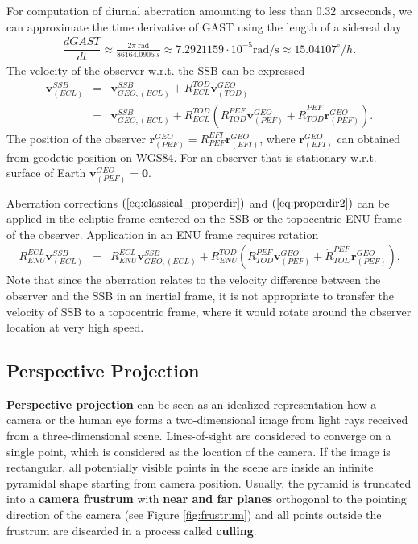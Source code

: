 \documentclass [12pt, a4paper] {article}
\newcommand{\vc}[1]
{
	\boldsymbol{#1}
}
\newcommand{\diff}[2]
{
	\dfrac{d #1}{d #2}
}
\begin{document}
For computation of diurnal aberration amounting to less than $0.32$ arcseconds, 
we can approximate the time derivative of GAST using the length of a sidereal 
day
\begin {eqnarray}
    \diff{GAST}{t}
    \approx 
    \frac{2\pi\:\textrm{rad}}{86164.0905\:s}
    \approx 7.2921159\cdot 10^{-5} \textrm{rad/s}
    \approx 15.04107^\circ /h.
\end {eqnarray}
The velocity of the observer w.r.t. the SSB can be expressed 
\begin {eqnarray}
    \vc v_{(ECL)}^{SSB} 
    &=& 
    \vc v_{GEO,(ECL)}^{SSB} + R_{ECL}^{TOD}\vc v_{(TOD)}^{GEO} 
    \\
    &=& 
    \vc v_{GEO,(ECL)}^{SSB} + R_{ECL}^{TOD}
    \left(
    R_{TOD}^{PEF}\vc v_{(PEF)}^{GEO}
    +
    {{\dot R}_{TOD}^{PEF}}\vc r_{(PEF)}^{GEO}
    \right).
\end {eqnarray}
The position of the observer 
$\vc r_{(PEF)}^{GEO} = R_{PEF}^{EFI}\vc r_{(EFI)}^{GEO}$, where 
$\vc r_{(EFI)}^{GEO}$ can obtained from geodetic position on WGS84.
For an observer that is stationary w.r.t. surface of Earth 
$\vc v_{(PEF)}^{GEO} = \vc 0$.

Aberration corrections $(\ref{eq:classical_properdir})$ and 
$(\ref{eq:properdir2})$ can be applied in the ecliptic frame centered 
on the SSB or the topocentric ENU frame of the observer. Application in an 
ENU frame requires rotation 
\begin {eqnarray}
    R^{ECL}_{ENU}\vc v_{(ECL)}^{SSB} 
    &=& 
    R^{ECL}_{ENU}\vc v_{GEO,(ECL)}^{SSB} + R_{ENU}^{TOD}
    \left(
    R_{TOD}^{PEF}\vc v_{(PEF)}^{GEO}
    +
    {{\dot R}_{TOD}^{PEF}}\vc r_{(PEF)}^{GEO}
    \right).
\end {eqnarray}
Note that since the aberration relates to the velocity difference between 
the observer and the SSB in an inertial frame, it is not appropriate to 
transfer the velocity of SSB to a topocentric frame, where it would rotate 
around the observer location at very high speed.
\subsection{Perspective Projection}
\textbf{Perspective projection} can be seen as an idealized representation how a
camera or the human eye forms a two-dimensional image from light rays received from 
a three-dimensional scene. Lines-of-sight are considered to converge on a single point,
which is considered as the location of the camera. If the image is rectangular, all 
potentially visible points in the scene are inside an infinite pyramidal shape 
starting from camera position. Usually, the pyramid is truncated into a 
\textbf{camera frustrum} with \textbf{near and far planes} orthogonal to the pointing 
direction of the camera (see Figure \ref{fig:frustrum}) and all points outside the frustrum 
are discarded in a process called \textbf{culling}. 
\end{document}
